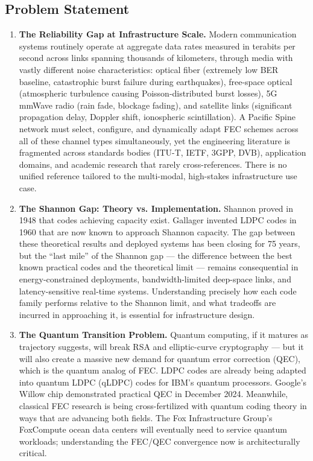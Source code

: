 \documentclass[11pt,letterpaper]{article}
\begin{document}
\subsection{Problem Statement}

\begin{enumerate}[leftmargin=*, label=\textbf{\arabic*.}]

\item \textbf{The Reliability Gap at Infrastructure Scale.} Modern communication systems routinely operate at aggregate data rates measured in terabits per second across links spanning thousands of kilometers, through media with vastly different noise characteristics: optical fiber (extremely low BER baseline, catastrophic burst failure during earthquakes), free-space optical (atmospheric turbulence causing Poisson-distributed burst losses), 5G mmWave radio (rain fade, blockage fading), and satellite links (significant propagation delay, Doppler shift, ionospheric scintillation). A Pacific Spine network must select, configure, and dynamically adapt FEC schemes across all of these channel types simultaneously, yet the engineering literature is fragmented across standards bodies (ITU-T, IETF, 3GPP, DVB), application domains, and academic research that rarely cross-references. There is no unified reference tailored to the multi-modal, high-stakes infrastructure use case.

\item \textbf{The Shannon Gap: Theory vs. Implementation.} Shannon proved in 1948 that codes achieving capacity exist. Gallager invented LDPC codes in 1960 that are now known to approach Shannon capacity. The gap between these theoretical results and deployed systems has been closing for 75 years, but the ``last mile'' of the Shannon gap --- the difference between the best known practical codes and the theoretical limit --- remains consequential in energy-constrained deployments, bandwidth-limited deep-space links, and latency-sensitive real-time systems. Understanding precisely how each code family performs relative to the Shannon limit, and what tradeoffs are incurred in approaching it, is essential for infrastructure design.

\item \textbf{The Quantum Transition Problem.} Quantum computing, if it matures as trajectory suggests, will break RSA and elliptic-curve cryptography --- but it will also create a massive new demand for quantum error correction (QEC), which is the quantum analog of FEC. LDPC codes are already being adapted into quantum LDPC (qLDPC) codes for IBM's quantum processors. Google's Willow chip demonstrated practical QEC in December 2024. Meanwhile, classical FEC research is being cross-fertilized with quantum coding theory in ways that are advancing both fields. The Fox Infrastructure Group's FoxCompute ocean data centers will eventually need to service quantum workloads; understanding the FEC/QEC convergence now is architecturally critical.


\end{enumerate}
\end{document}
